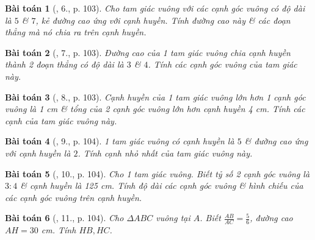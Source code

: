\documentclass{article}
\newtheorem{baitoan}{Bài toán}
\begin{document}
\begin{baitoan}[\cite{SBT_Toan_9_tap_1}, 6., p. 103]
	Cho tam giác vuông với các cạnh góc vuông có độ dài là $5$ \& $7$, kẻ đường cao ứng với cạnh huyền. Tính đường cao này \& các đoạn thẳng mà nó chia ra trên cạnh huyền.
\end{baitoan}

\begin{baitoan}[\cite{SBT_Toan_9_tap_1}, 7., p. 103]
	Đường cao của 1 tam giác vuông chia cạnh huyền thành 2 đoạn thẳng có độ dài là $3$ \& $4$. Tính các cạnh góc vuông của tam giác này.
\end{baitoan}

\begin{baitoan}[\cite{SBT_Toan_9_tap_1}, 8., p. 103]
	Cạnh huyền của 1 tam giác vuông lớn hơn 1 cạnh góc vuông là {\rm1 cm} \& tổng của 2 cạnh góc vuông lớn hơn cạnh huyền {\rm4 cm}. Tính các cạnh của tam giác vuông này.
\end{baitoan}

\begin{baitoan}[\cite{SBT_Toan_9_tap_1}, 9., p. 104]
	1 tam giác vuông có cạnh huyền là $5$ \& đường cao ứng với cạnh huyền là $2$. Tính cạnh nhỏ nhất của tam giác vuông này.
\end{baitoan}

\begin{baitoan}[\cite{SBT_Toan_9_tap_1}, 10., p. 104]
	Cho 1 tam giác vuông. Biết tỷ số 2 cạnh góc vuông là $3:4$ \& cạnh huyền là {\rm125 cm}. Tính độ dài các cạnh góc vuông \& hình chiếu của các cạnh góc vuông trên cạnh huyền.
\end{baitoan}

\begin{baitoan}[\cite{SBT_Toan_9_tap_1}, 11., p. 104]
	Cho $\Delta ABC$ vuông tại $A$. Biết $\frac{AB}{AC} = \frac{5}{6}$, đường cao $AH = 30$ {\rm cm}. Tính $HB,HC$.
\end{baitoan}
\end{document}
